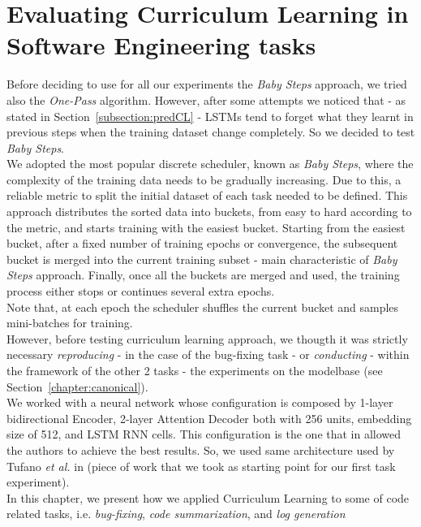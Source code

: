 \chapter{Evaluating Curriculum Learning in Software Engineering tasks}
\label{chapter:chap4}
Before deciding to use for all our experiments the \textit{Baby Steps} approach, we 
tried also the \textit{One-Pass} algorithm. However, after some attempts we noticed that - as 
stated in Section~\ref{subsection:predCL} - LSTMs tend to forget what they learnt in previous steps when the training dataset 
change completely. So we decided to test \textit{Baby Steps}.\\
We adopted the most popular discrete scheduler, known as \textit{Baby Steps}, where the complexity of the training
data needs to be gradually increasing. Due to this, a reliable metric to split the initial dataset of each task needed to be defined.
This approach distributes the sorted data into buckets, from easy to hard according to the metric, and starts training with the easiest bucket. 
Starting from the easiest bucket, after a fixed number of training epochs or convergence, the subsequent bucket is merged
into the current training subset - main characteristic of \textit{Baby Steps} approach.
Finally, once all the buckets are merged and used, the
training process either stops or continues several extra epochs.\\
Note that, at each epoch the scheduler shuffles the current bucket and samples mini-batches for training.\\
\newline
However, before testing curriculum learning approach, we thougth it was strictly necessary \textit{reproducing} - in the case 
of the bug-fixing task - or \textit{conducting} -  within the framework of the other 2 tasks - the experiments on the modelbase (see Section~\ref{chapter:canonical}).\\
We worked with a neural network whose configuration is composed by 1-layer bidirectional Encoder, 2-layer Attention 
Decoder both with 256 units, embedding size of 512, and LSTM RNN cells. This configuration is the one that in 
\cite{Tufano2019} allowed the authors to achieve the best results. So, we used same architecture 
used by Tufano \textit{et al.} in \cite{Tufano2019} (piece of work that we took as starting point 
for our first task experiment).\\
\newline
In this chapter, we present how we applied Curriculum Learning to some of code related tasks, i.e. \textit{bug-fixing}, \textit{code summarization}, and \textit{log generation}
